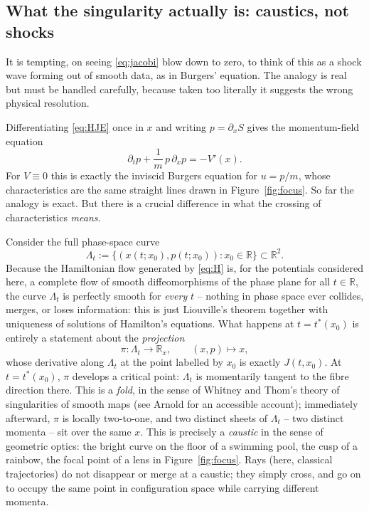 \subsection{What the singularity actually is: caustics, not shocks}
\label{sec:geometry}

It is tempting, on seeing \eqref{eq:jacobi} blow down to zero, to think of this
as a shock wave forming out of smooth data, as in Burgers' equation. The
analogy is real but must be handled carefully, because taken too literally it
suggests the wrong physical resolution.

Differentiating \eqref{eq:HJE} once in $x$ and writing $p=\partial_xS$ gives the momentum-field equation
\begin{equation}
\partial_tp + \frac{1}{m}\,p\,\partial_xp = -V'(x).
\label{eq:burgers}
\end{equation}
For $V\equiv0$ this is exactly the inviscid Burgers equation for $u=p/m$, whose
characteristics are the same straight lines drawn in Figure~\ref{fig:focus}. So
far the analogy is exact. But there is a crucial difference in what the
crossing of characteristics \emph{means}.

Consider the full phase-space curve
\[
\Lambda_t := \big\{(x(t;x_0),p(t;x_0)) : x_0\in\mathbb{R}\big\} \subset \mathbb{R}^2.
\]
Because the Hamiltonian flow generated by \eqref{eq:H} is, for the potentials
considered here, a complete flow of smooth diffeomorphisms of the phase plane
for all $t\in\mathbb{R}$, the curve $\Lambda_t$ is perfectly smooth for
\emph{every} $t$ -- nothing in phase space ever collides, merges, or loses
information: this is just Liouville's theorem together with uniqueness of
solutions of Hamilton's equations. What happens at $t=t^\ast(x_0)$ is entirely
a statement about the \emph{projection}
\[
\pi:\Lambda_t\to\mathbb{R}_x, \qquad (x,p)\mapsto x,
\]
whose derivative along $\Lambda_t$ at the point labelled by $x_0$ is exactly
$J(t,x_0)$. At $t=t^\ast(x_0)$, $\pi$ develops a critical point: $\Lambda_t$ is
momentarily tangent to the fibre direction there. This is a \emph{fold}, in the
sense of Whitney and Thom's theory of singularities of smooth maps (see Arnold
\cite{ArnoldCatastrophe} for an accessible account); immediately afterward,
$\pi$ is locally two-to-one, and two distinct sheets of $\Lambda_t$ -- two
distinct momenta -- sit over the same $x$. This is precisely a \emph{caustic}
in the sense of geometric optics: the bright curve on the floor of a swimming
pool, the cusp of a rainbow, the focal point of a lens in
Figure~\ref{fig:focus}. Rays (here, classical trajectories) do not disappear or
merge at a caustic; they simply cross, and go on to occupy the same point in
configuration space while carrying different momenta.

